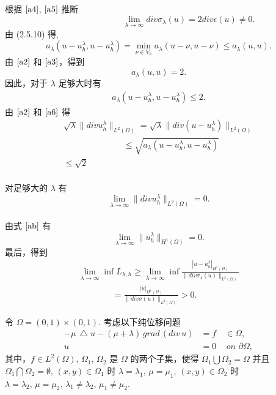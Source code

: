 \documentclass[a4paper,UTF8,titlepage,10pt]{ctexart}
\numberwithin{equation}{subsection}
\begin{document}
	根据 $\eqref{a4}$, $\eqref{a5}$ 推断
	$$
	\quad \quad \quad \quad \quad \quad \quad
	\lim\limits_{\lambda \to \infty} div \sigma_{\lambda}(u) = 2 div \epsilon(u) \ne 0. 
	$$
	由 (2.5.10) 得,
	$$
	a_{\lambda}(u-u_h^{\lambda}, u-u_h^{\lambda}) = \min\limits_{\nu \in V_h} a_{\lambda}(u-\nu,u-\nu) \le a_{\lambda}(u,u).
	$$
	由 $\eqref{a2}$ 和 $\eqref{a3}$，得到
	$$
	a_{\lambda}(u,u) = 2.
	$$
	因此，对于 $\lambda$ 足够大时有
	\begin{align} 
	a_{\lambda} (u-u_h^{\lambda}, u-u_h^{\lambda}) \le 2. \label{a6}
	\end{align}
	由 $\eqref{a2}$ 和 $\eqref{a6}$ 得
	\\
	$$
	\begin{matrix}
		\sqrt{\lambda} \| div u_h^{\lambda} \|_{L^2(\Omega)} = \sqrt{\lambda} \| div(u-u_h^{\lambda}) \|_{L^2(\Omega)} \\ 
		\quad \quad \quad \quad \quad \quad \quad
		\le \sqrt{a_{\lambda}(u-u_h^{\lambda}, u-u_h^{\lambda})} \\
		\le \sqrt{2}	
	\end{matrix}
	$$
	\\
	对足够大的 $\lambda$ 有
	$$
	\lim\limits_{\lambda \to \infty} \| div u_h^{\lambda} \|_{L^2(\Omega)} = 0.
	$$
	\\
	由式 $\eqref{ab}$ 有
	$$
	\lim\limits_{\lambda \to \infty} \| u_h^{\lambda} \|_{H^1(\Omega)} = 0.
	$$
	最后，得到 %
	$$ 
	\begin{matrix}
		\lim\limits_{\lambda \to \infty}\inf L_{\lambda,h} \ge \lim\limits_{\lambda \to \infty}\inf \frac{|u-u_h^{\lambda}|_{H^1(\Omega)}}{\| div \sigma_{\lambda}(u) \|_{L^2(\Omega)}} \\
		\quad \quad \quad \quad
		= \frac{|u|_{H^1(\Omega)}}{\| div \sigma(u) \|_{L^2(\Omega)}} > 0.
	\end{matrix}
	$$
	\fi

令 $\Omega = (0,1) \times (0,1).$ 考虑以下纯位移问题
\begin{equation}
\begin{aligned}
	-\mu \, \bigtriangleup u - (\mu + \lambda) \, grad \, (div \, u) &= f \quad \in \Omega, \\
	u &= 0 \quad \, on \, \, \partial \Omega ,
	\label{11.4.1}
\end{aligned}
\end{equation}
其中，$f \in L^2(\Omega), \, \Omega_1, \, \Omega_2$ 是 $\Omega$ 的两个子集，使得 $\Omega_1 \bigcup \Omega_2 = \Omega$ 并且 $\Omega_1 \bigcap \Omega_2 = \emptyset, \, (x,y) \in \Omega_1$ 时 $\lambda = \lambda_1, \, \mu = \mu_1, \, (x,y) \in \Omega_2$ 时 $\lambda = \lambda_2, \, \mu = \mu_2, \, \lambda_1 \ne \lambda_2, \, \mu_1 \ne \mu_2.$ 
\end{document}

